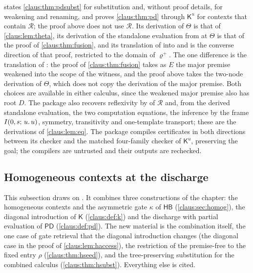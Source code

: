 \begin{remark}
\label{claus:rem:pdpkgs}
 states \cref{claus:thm:pdsubst} for
substitution and, without proof details, for weakening and renaming, and
proves \cref{claus:thm:pd} through $\mathsf{K}^{u}$ for contexts that
contain $\mathcal{R}$; the proof above does not use $\mathcal{R}$. Its
derivation of $\Theta$ is that of \cref{claus:lem:theta}, its derivation of
the standalone evaluation from  at $\Theta$ is that of
the proof of \cref{claus:thm:fusion}, and its translation of
 into  and  is the
converse direction of that proof, restricted to the domain of
$\varrho^{+}$. The one difference is the translation of :
the proof of \cref{claus:thm:fusion} takes as $E$ the major premise
weakened into the scope of the witness, and the proof above takes the
two-node derivation of $\Theta$, which does not copy the derivation of the
major premise. Both choices are available in either calculus, since the
weakened major premise also has root $D$. The package also recovers
reflexivity by  of $\mathcal{R}$ and, from the derived
standalone evaluation, the two computation equations, the inference
 by the frame $I(0,s;\,u.\,u)$, symmetry, transitivity and
one-template transport; these are the derivations of \cref{claus:lem:eq}.
The package compiles certificates in both directions between its checker
and the matched four-family checker of $\mathsf{K}^{u}$, preserving the
goal; the compilers are untrusted and their outputs are rechecked.
\end{remark}

\subsection{Homogeneous contexts at the discharge}
\label{claus:sec:hd}

This subsection draws on . It combines three
constructions of the chapter: the homogeneous contexts and the asymmetric
gate $\kappa$ of $\mathsf{HB}$ (\cref{claus:sec:homog}), the diagonal
introduction of $\mathsf{K}$ (\cref{claus:def:k}) and the discharge with
partial evaluation of $\mathsf{PD}$ (\cref{claus:def:pd}). The new
material is the combination itself, the one case of gate retrieval that
the diagonal introduction changes (the diagonal case in the proof of
\cref{claus:lem:haccess}), the restriction of the premise-free
 to the fixed entry $\rho$ (\cref{claus:thm:hseed}), and
the tree-preserving substitution for the combined calculus
(\cref{claus:thm:hsubst}). Everything else is cited.

